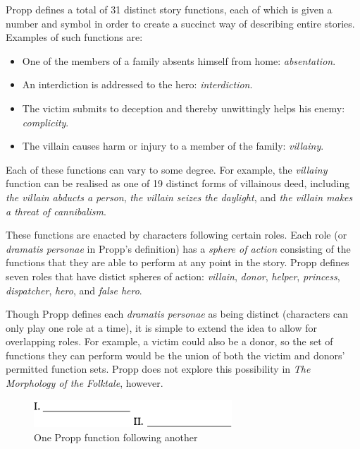 Propp defines a total of 31 distinct story functions, each of which is given a number and symbol in order to create a succinct way of describing entire stories. Examples of such functions are:

\begin{itemize}
  \item One of the members of a family absents himself from home: \emph{absentation}.
  \item An interdiction is addressed to the hero: \emph{interdiction}.
  \item The victim submits to deception and thereby unwittingly helps his enemy: \emph{complicity}.
  \item The villain causes harm or injury to a member of the family: \emph{villainy}.
\end{itemize}

Each of these functions can vary to some degree. For example, the \emph{villainy} function can be realised as one of 19 distinct forms of villainous deed, including \emph{the villain abducts a person}, \emph{the villain seizes the daylight}, and \emph{the villain makes a threat of cannibalism}.

These functions are enacted by characters following certain roles. Each role (or \emph{dramatis personae} in Propp's definition) has a \emph{sphere of action} consisting of the functions that they are able to perform at any point in the story. Propp defines seven roles that have distict spheres of action: \emph{villain}, \emph{donor}, \emph{helper}, \emph{princess}, \emph{dispatcher}, \emph{hero}, and \emph{false hero}.

Though Propp defines each \emph{dramatis personae} as being distinct (characters can only play one role at a time), it is simple to extend the idea to allow for overlapping roles. For example, a victim could also be a donor, so the set of functions they can perform would be the union of both the victim and donors' permitted function sets. Propp does not explore this possibility in \emph{The Morphology of the Folktale}, however.

\begin{figure}[!t]
\centerline{\includegraphics[height=0.4in]{propp1.png}}
\caption{One Propp function following another}\label{fig:propp1}
\end{figure}

